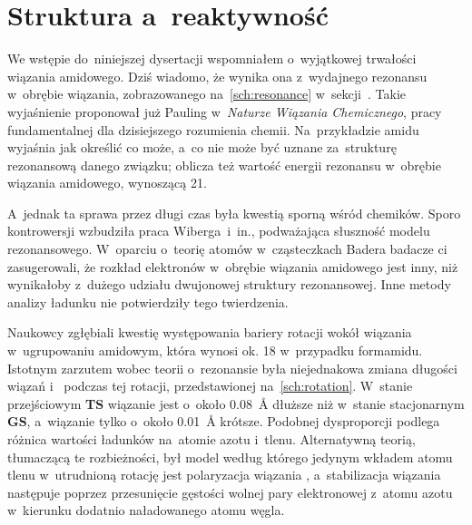 \section{Struktura a~reaktywność}\label{literature:structure}
We wstępie do~niniejszej dysertacji wspomniałem o~wyjątkowej trwałości wiązania amidowego.
Dziś wiadomo, że wynika ona z~wydajnego rezonansu w~obrębie wiązania, zobrazowanego
  na~\cref{sch:resonance} w~sekcji~.
Takie wyjaśnienie proponował już Pauling w~\textit{Naturze Wiązania Chemicznego},
  pracy fundamentalnej dla dzisiejszego rozumienia chemii.
Na~przykładzie amidu wyjaśnia jak określić co może, a~co nie może być uznane za~strukturę
  rezonansową danego związku; oblicza też wartość energii rezonansu w~obrębie wiązania amidowego,
  wynoszącą \SI{21}{\kcalpm}.
  
A~jednak ta sprawa przez długi czas była kwestią sporną wśród chemików.
Sporo kontrowersji wzbudziła praca Wiberga~i~in.,
  podważająca słuszność modelu rezonansowego.
W~oparciu o~teorię atomów w~cząsteczkach
  Badera badacze ci zasugerowali, że rozkład elektronów w~obrębie wiązania amidowego jest inny,
  niż wynikałoby z~dużego udziału dwujonowej struktury rezonansowej.
Inne metody analizy ładunku nie potwierdziły tego twierdzenia.

\begin{marginscheme}[-1\baselineskip]
  
  \caption{
    Dysproporcja zmian długości wiązań  i~ między stanem stacjonarnym
      a~stanem przejściowym podczas rotacji wokół wiązania  w~formamidzie.
  }
  \label{sch:rotation}
\end{marginscheme}
Naukowcy zgłębiali kwestię występowania bariery rotacji wokół wiązania  w~ugrupowaniu
  amidowym, która wynosi ok. \SI{18}{\kcalpm} w~przypadku formamidu.
Istotnym zarzutem wobec teorii o~rezonansie była niejednakowa zmiana długości wiązań 
  i~ podczas tej rotacji, przedstawionej na~\cref{sch:rotation}.
W~stanie przejściowym \textbf{TS} wiązanie  jest o~około \SI{0.08}{\angstrom} dłuższe niż
  w~stanie stacjonarnym \textbf{GS}, a~wiązanie  tylko o~około \SI{0.01}{\angstrom} krótsze.
Podobnej dysproporcji podlega różnica wartości ładunków na~atomie azotu i~tlenu.
Alternatywną teorią, tłumaczącą te rozbieżności, był model według którego jedynym wkładem
  atomu tlenu w~utrudnioną rotację jest polaryzacja wiązania ,
  a~stabilizacja wiązania  następuje poprzez przesunięcie gęstości wolnej pary elektronowej
  z~atomu azotu w~kierunku dodatnio naładowanego atomu węgla.

